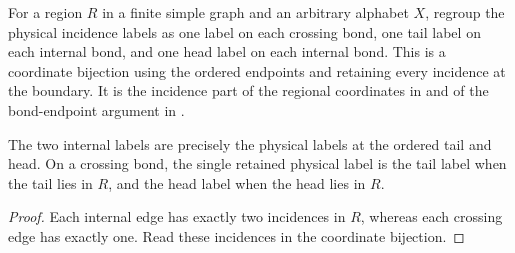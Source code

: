 \begin{definition}%
    \label{def:peps_region_half_edge_label_equiv}
    \leanok
    For a region $R$ in a finite simple graph and an arbitrary alphabet $X$,
    regroup the physical incidence labels as one label on each crossing bond,
    one tail label on each internal bond, and one head label on each internal
    bond. This is a coordinate bijection using the ordered endpoints and
    retaining every incidence at the boundary.
    It is the incidence part of the regional coordinates in
    \cite[Section~6.2]{Schuch2010PEPS} and of the bond-endpoint argument in
    \cite[Section~7]{Schuch2010PEPS}.
\end{definition}

\begin{lemma}%
    \label{lem:peps_region_half_edge_label_endpoints}
    \leanok
    The two internal labels are precisely the physical labels at the ordered
    tail and head. On a crossing bond, the single retained physical label is
    the tail label when the tail lies in $R$, and the head label when the
    head lies in $R$.
\end{lemma}

\begin{proof}\leanok
    Each internal edge has exactly two incidences in $R$, whereas each crossing
    edge has exactly one. Read these incidences in the coordinate bijection.
\end{proof}
